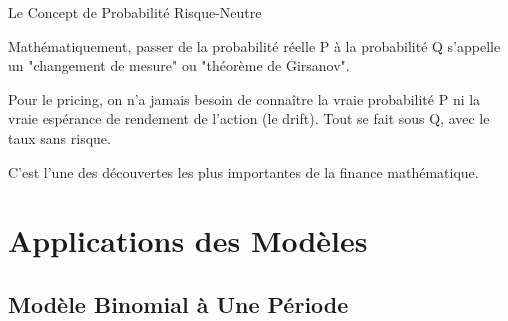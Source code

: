 \documentclass[aspectratio=169, 10pt]{beamer}
\begin{document}
\begin{frame}{Le Concept de Probabilité Risque-Neutre}
{        Mathématiquement, passer de la probabilité réelle P à la probabilité Q
        s'appelle un "changement de mesure" ou "théorème de Girsanov".
        
        Pour le pricing, on n'a jamais besoin de connaître la vraie probabilité P
        ni la vraie espérance de rendement de l'action (le drift).
        Tout se fait sous Q, avec le taux sans risque.
        
        C'est l'une des découvertes les plus importantes de la finance mathématique.
    }
\end{frame}

\section{Applications des Modèles}

\subsection{Modèle Binomial à Une Période}
\end{document}
